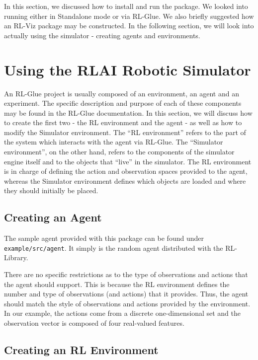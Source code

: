 \documentclass[12pt]{article}
\newcommand{\code}[1]{\texttt{#1}}
\begin{document}
In this section, we discussed how to install and run the package. We looked
into running either in Standalone mode or via RL-Glue. We also briefly
suggested how an RL-Viz package may be constructed. In the following section,
we will look into actually using the simulator - creating agents and
environments.

\section{Using the RLAI Robotic Simulator}

An RL-Glue project is usually composed of an environment, an agent and
an experiment. The specific description and purpose of each of these 
components may be found in the RL-Glue documentation. In this section, we
will discuss how to create the first two - the RL environment and the agent -
as well as how to modify the Simulator environment. The ``RL environment''
refers to the part of the system which interacts with the agent via RL-Glue.
The ``Simulator environment'', on the other hand, refers to the components
of the simulator engine itself and to the objects that ``live'' in the
simulator. The RL environment is in charge of defining the action and 
observation spaces provided to the agent, whereas the Simulator environment
defines which objects are loaded and where they should initially be placed.

\subsection{Creating an Agent}

The sample agent provided with this package can be found under
\code{example/src/agent}. It simply is the random agent distributed with the 
RL-Library.

There are no specific restrictions as to the type of observations and 
actions that the agent should support. This is because the RL environment
defines the number and type of observations (and actions) that it provides.
Thus, the agent should match the style of observations and actions provided
by the environment. In our example, the actions come from a discrete 
one-dimensional set and the observation vector is composed of four real-valued 
features.

\subsection{Creating an RL Environment}
\end{document}

